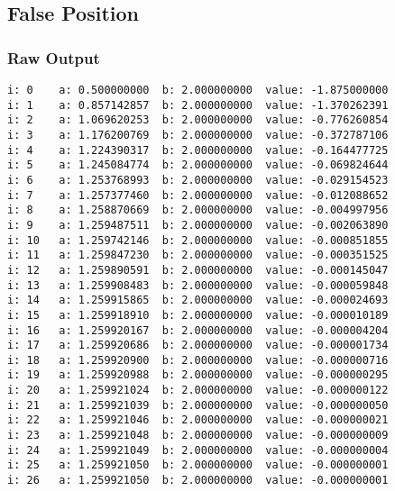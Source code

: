 \documentclass[11pt]{article} %
\begin{document}
\subsection*{False Position}
\subsubsection*{Raw Output}
\begin{verbatim}
i: 0	a: 0.500000000	b: 2.000000000	value: -1.875000000
i: 1	a: 0.857142857	b: 2.000000000	value: -1.370262391
i: 2	a: 1.069620253	b: 2.000000000	value: -0.776260854
i: 3	a: 1.176200769	b: 2.000000000	value: -0.372787106
i: 4	a: 1.224390317	b: 2.000000000	value: -0.164477725
i: 5	a: 1.245084774	b: 2.000000000	value: -0.069824644
i: 6	a: 1.253768993	b: 2.000000000	value: -0.029154523
i: 7	a: 1.257377460	b: 2.000000000	value: -0.012088652
i: 8	a: 1.258870669	b: 2.000000000	value: -0.004997956
i: 9	a: 1.259487511	b: 2.000000000	value: -0.002063890
i: 10	a: 1.259742146	b: 2.000000000	value: -0.000851855
i: 11	a: 1.259847230	b: 2.000000000	value: -0.000351525
i: 12	a: 1.259890591	b: 2.000000000	value: -0.000145047
i: 13	a: 1.259908483	b: 2.000000000	value: -0.000059848
i: 14	a: 1.259915865	b: 2.000000000	value: -0.000024693
i: 15	a: 1.259918910	b: 2.000000000	value: -0.000010189
i: 16	a: 1.259920167	b: 2.000000000	value: -0.000004204
i: 17	a: 1.259920686	b: 2.000000000	value: -0.000001734
i: 18	a: 1.259920900	b: 2.000000000	value: -0.000000716
i: 19	a: 1.259920988	b: 2.000000000	value: -0.000000295
i: 20	a: 1.259921024	b: 2.000000000	value: -0.000000122
i: 21	a: 1.259921039	b: 2.000000000	value: -0.000000050
i: 22	a: 1.259921046	b: 2.000000000	value: -0.000000021
i: 23	a: 1.259921048	b: 2.000000000	value: -0.000000009
i: 24	a: 1.259921049	b: 2.000000000	value: -0.000000004
i: 25	a: 1.259921050	b: 2.000000000	value: -0.000000001
i: 26	a: 1.259921050	b: 2.000000000	value: -0.000000001
\end{verbatim}
\end{document}
